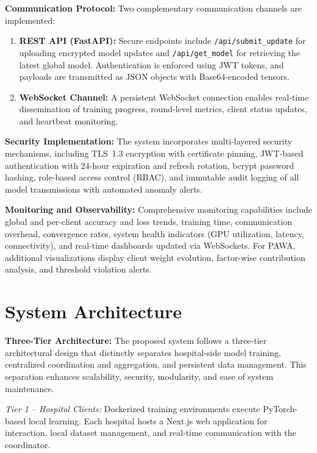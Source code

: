 \textbf{Communication Protocol:}
Two complementary communication channels are implemented:

\begin{enumerate}
    \item \textbf{REST API (FastAPI):} Secure endpoints include \texttt{/api/submit\_update} for uploading encrypted model updates and \texttt{/api/get\_model} for retrieving the latest global model. Authentication is enforced using JWT tokens, and payloads are transmitted as JSON objects with Base64-encoded tensors.
    
    \item \textbf{WebSocket Channel:} A persistent WebSocket connection enables real-time dissemination of training progress, round-level metrics, client status updates, and heartbeat monitoring.
\end{enumerate}

\textbf{Security Implementation:}
The system incorporates multi-layered security mechanisms, including TLS~1.3 encryption with certificate pinning, JWT-based authentication with 24-hour expiration and refresh rotation, bcrypt password hashing, role-based access control (RBAC), and immutable audit logging of all model transmissions with automated anomaly alerts.

\textbf{Monitoring and Observability:}
Comprehensive monitoring capabilities include global and per-client accuracy and loss trends, training time, communication overhead, convergence rates, system health indicators (GPU utilization, latency, connectivity), and real-time dashboards updated via WebSockets. For PAWA, additional visualizations display client weight evolution, factor-wise contribution analysis, and threshold violation alerts.

\section{System Architecture}

\textbf{Three-Tier Architecture:} 
The proposed system follows a three-tier architectural design that distinctly separates hospital-side model training, centralized coordination and aggregation, and persistent data management. This separation enhances scalability, security, modularity, and ease of system maintenance.


\textit{Tier 1 -- Hospital Clients:} Dockerized training environments execute PyTorch-based local learning. Each hospital hosts a Next.js web application for interaction, local dataset management, and real-time communication with the coordinator.

